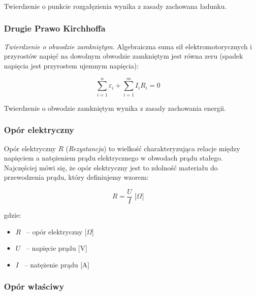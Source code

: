\documentclass[a4paper,12pts]{article}
\begin{document}
	Twierdzenie o punkcie rozgałęzienia wynika z zasady zachowana ładunku.
	
	
	\subsubsection{Drugie Prawo Kirchhoffa}
	
	\textit{Twierdzenie o obwodzie zamkniętym.} Algebraiczna suma sił elektromotorycznych i przyrostów napięć na dowolnym obwodzie zamkniętym jest równa zeru (spadek napięcia jest przyrostem ujemnym napięcia):
	
	\begin{equation}
		\sum_{i=1}^{n} \varepsilon_{i} + \sum_{i=1}^{m} I_{i} R_{i} = 0
	\end{equation}
	
	Twierdzenie o obwodzie zamkniętym wynika z zasady zachowania energii.
	

	\subsubsection{Opór elektryczny}
	
	Opór elektryczny $R$ (\textit{Rezystancja}) to wielkość charakteryzująca relacje między napięciem a natężeniem prądu elektrycznego w obwodach prądu stałego. Najczęściej mówi się, że opór elektryczny jest to zdolność materiału do przewodzenia prądu, który definiujemy wzorem:
	
	\begin{equation}
		R = \frac{U}{I} \textrm{ [$\Omega$]}
	\end{equation}

	gdzie:
	\begin{itemize}
		\item $R$ ~-- opór elektryczny [$\Omega$]
		\item $U$ ~-- napięcie prądu [V]
		\item $I$ ~-- natężenie prądu [A]
	\end{itemize}

	
	\subsubsection{Opór właściwy}
	
\end{document}
